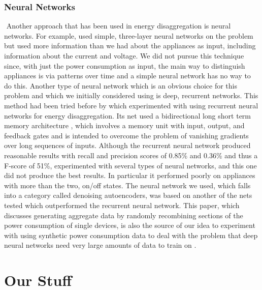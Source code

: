 \documentclass{article}
\begin{document}
\subsubsection{Neural Networks}
​
Another approach that has been used in energy disaggregation is neural networks. For example, \cite{Ruzzelli} used simple, three-layer neural networks on the problem but used more information than we had about the appliances as input, including information about the current and voltage. We did not pursue this technique since, with just the power consumption as input, the main way to distinguish appliances is via patterns over time and a simple neural network has no way to do this. Another type of neural network which is an obvious choice for this problem and which we initially considered using is deep, recurrent networks. This method had been tried  before by \cite{Kelly} which experimented with using recurrent neural networks for energy disaggregation. Its net used a bidirectional long short term memory architecture \cite{Kelly}, which involves a memory unit with input, output, and feedback gates and is intended to overcome the problem of vanishing gradients over long sequences of inputs. Although the recurrent neural network produced reasonable results with recall and precision scores of 0.85\% and 0.36\% and thus a F-score of 51\%, \cite{Kelly} experimented with several types of neural networks, and this one did not produce the best results. In particular it performed poorly on appliances with more than the two, on/off states. The neural network we used, which falls into a category called denoising autoencoders, was based on another of the nets \cite{Kelly} tested which outperformed the recurrent neural network. This paper, which discusses generating aggregate data by randomly recombining sections of the power consumption of single devices, is also the source of our idea to experiment with using synthetic power consumption data to deal with the problem that deep neural networks need very large amounts of data to train on \cite{Kelly}.


\section{Our Stuff}

\end{document}
